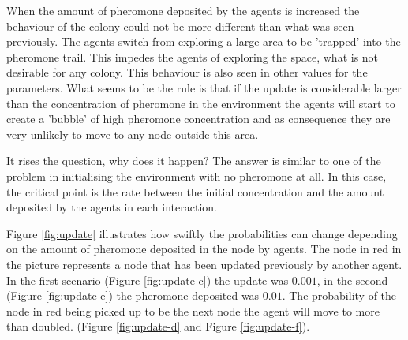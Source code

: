 When the amount of pheromone deposited by the agents is increased the behaviour of the colony could not be more different than what was seen previously. The agents switch from exploring a large area to be 'trapped' into the pheromone trail. This impedes the agents of exploring the space, what is not desirable for any colony. This behaviour is also seen in other values for the parameters. What seems to be the rule is that if the update is considerable larger than the concentration of pheromone in the environment the agents will start to create a 'bubble' of high pheromone concentration and as consequence they are very unlikely to move to any node outside this area.

It rises the question, why does it happen? The answer is similar to one of the problem in initialising the environment with no pheromone at all. In this case, the critical point is the rate between the initial concentration and the amount deposited by the agents in each interaction.

Figure \ref{fig:update} illustrates how swiftly the probabilities can change depending on the amount of pheromone deposited in the node by agents. The node in red in the picture represents a node that has been updated previously by another agent. In the first scenario (Figure \ref{fig:update-c}) the update was $0.001$, in the second (Figure \ref{fig:update-e}) the pheromone deposited was $0.01$. The probability of the node in red being picked up to be the next node the agent will move to more than doubled. (Figure \ref{fig:update-d} and Figure \ref{fig:update-f}).

